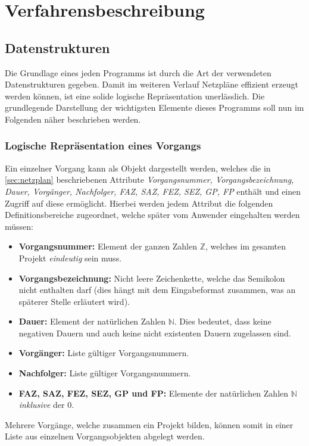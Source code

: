 \chapter{Verfahrensbeschreibung}
\label{Verfahrensbeschreibung}

\section{Datenstrukturen}

Die Grundlage eines jeden Programms ist durch die Art der verwendeten
Datenstrukturen gegeben. Damit im weiteren Verlauf Netzpl\"ane
effizient erzeugt werden k\"onnen, ist eine solide logische
Repr\"asentation unerl\"asslich. Die grundlegende Darstellung der
wichtigsten Elemente dieses Programms soll nun im Folgenden n\"aher
beschrieben werden.


\subsection{Logische Repr\"asentation eines Vorgangs}
\label{vorgang}
Ein einzelner Vorgang kann als Objekt dargestellt werden, welches die
in \ref{sec:netzplan} beschriebenen Attribute \textit{Vorgangsnummer,
  Vorgangsbezeichnung, Dauer, Vorg\"anger, Nachfolger, FAZ, SAZ, FEZ,
  SEZ, GP, FP}  enth\"alt und einen
Zugriff auf diese erm\"oglicht. Hierbei werden jedem Attribut die
folgenden Definitionsbereiche zugeordnet, welche sp\"ater vom Anwender
eingehalten werden m\"ussen:
\begin{itemize}
  \item \textbf{Vorgangsnummer:} Element der ganzen Zahlen \(\mathbb{Z}\),
    welches im gesamten Projekt \textit{eindeutig} sein muss.
  \item \textbf{Vorgangsbezeichnung:} Nicht leere Zeichenkette, welche
    das Semikolon nicht enthalten darf (dies h\"angt mit dem
    Eingabeformat zusammen, was an sp\"aterer Stelle erl\"autert
    wird).
  \item \textbf{Dauer:} Element der nat\"urlichen Zahlen
    \(\mathbb{N}\). Dies bedeutet, dass keine negativen Dauern und
    auch keine nicht existenten Dauern zugelassen sind.
  \item \textbf{Vorg\"anger:} Liste g\"ultiger Vorgangsnummern.
  \item \textbf{Nachfolger:} Liste g\"ultiger Vorgangsnummern.
  \item \textbf{FAZ, SAZ, FEZ, SEZ, GP und FP:} Elemente der nat\"urlichen
    Zahlen \(\mathbb{N}\) \textit{inklusive} der \(0\).
\end{itemize}
Mehrere Vorg\"ange, welche zusammen ein Projekt bilden, k\"onnen somit in
einer Liste aus einzelnen Vorgangsobjekten abgelegt werden.


